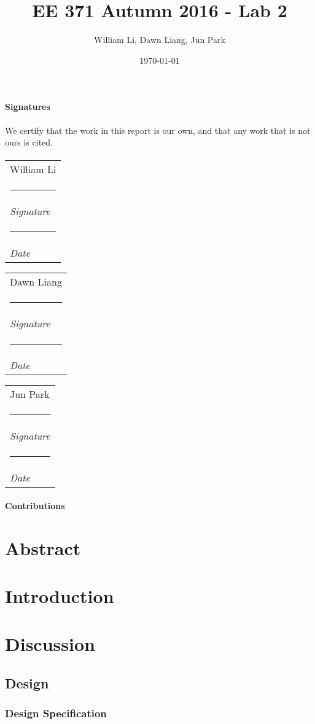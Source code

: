 \documentclass{article}
\title{EE 371 Autumn 2016 - Lab 2}
\date{\today}
\author{William Li, Dawn Liang, Jun Park}
\begin{document}
\newcommand{\namesigdate}[2][5cm]{
  \begin{tabular}{@{}p{#1}@{}}
    #2 \\[2\normalbaselineskip] \hrule \\[0pt]
    {\small \textit{Signature}} \\[2\normalbaselineskip] \hrule \\[0pt]
    {\small \textit{Date}}
  \end{tabular}
}

\maketitle
\newpage

\paragraph{Signatures} We certify that the work in this report is our own, and that any work that is not ours is cited.
\paragraph{} \noindent \namesigdate{William Li} \hfill \namesigdate{Dawn Liang} \hfill \namesigdate{Jun Park}

\paragraph{Contributions}

\newpage

\tableofcontents
\newpage


\section{Abstract}


\section{Introduction}


\section{Discussion}
  \subsection{Design}
    \subsubsection{Design Specification}
\end{document}
